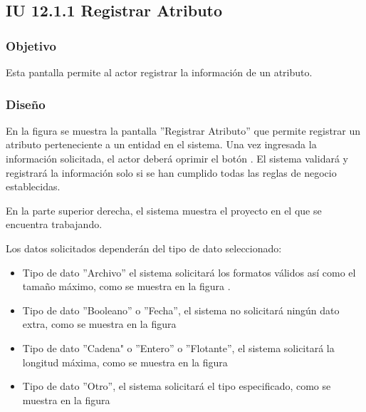 \subsection{IU 12.1.1 Registrar Atributo}

\subsubsection{Objetivo}
	Esta pantalla permite al actor registrar la información de un atributo.
\subsubsection{Diseño}
	En la figura  se muestra la pantalla ''Registrar Atributo'' que permite registrar un atributo perteneciente a un entidad en el sistema.
	Una vez ingresada la información solicitada, el actor deberá oprimir el botón  . El sistema validará y registrará la información solo si se han cumplido todas las reglas de negocio establecidas.
	
	En la parte superior derecha, el sistema muestra el proyecto en el que se encuentra trabajando.
	
	
	Los datos solicitados dependerán del tipo de dato seleccionado:
	\begin{itemize}
		\item Tipo de dato ''Archivo'' el sistema solicitará los formatos válidos así como el tamaño máximo, como se muestra en la figura .
		\item Tipo de dato ''Booleano'' o ''Fecha'', el sistema no solicitará ningún dato extra, como se muestra en la figura 
		\item Tipo de dato ''Cadena" o ''Entero'' o ''Flotante'', el sistema solicitará la longitud máxima, como se muestra en la figura 
		\item Tipo de dato ''Otro'', el sistema solicitará el tipo especificado, como se muestra en la figura 
	\end{itemize}


